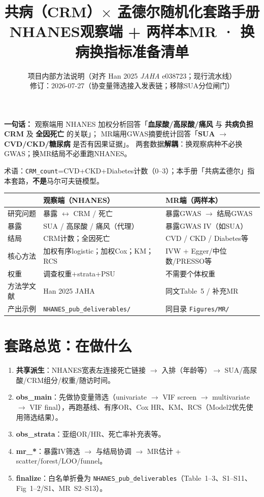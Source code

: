 \documentclass[11pt,a4paper]{article}
\title{\textbf{共病（CRM）$\times$ 孟德尔随机化套路手册}\\[0.4em]
\large NHANES观察端 + 两样本MR · 换病换指标准备清单}
\author{项目内部方法说明（对齐 Han 2025 \textit{JAHA} e038723；现行流水线）\\
\small 修订：2026-07-27（协变量筛选接入发表链；移除SUA分位闸门）}
\date{}
\begin{document}
\maketitle
\thispagestyle{fancy}

\noindent
\textbf{一句话：}
观察端用 NHANES 加权分析回答「\textbf{血尿酸/高尿酸/痛风} 与 \textbf{共病负担CRM} 及 \textbf{全因死亡} 的关联」；
MR端用GWAS摘要统计回答「\textbf{SUA} $\rightarrow$ \textbf{CVD/CKD/糖尿病} 是否有因果证据」。
两套数据\textbf{解耦}：换观察病种不必换GWAS；换MR结局不必重跑NHANES。

\noindent\small\color{gray!40!black}
术语：\texttt{CRM\_count}=CVD+CKD+Diabetes计数（0--3）；本手册「共病孟德尔」指本套路，\textbf{不是}马尔可夫链模型。

\vspace{0.5em}
\begin{center}
\small
\begin{tabular}{@{}L{0.20\textwidth}L{0.38\textwidth}L{0.38\textwidth}@{}}
\toprule
& \textbf{观察端（NHANES）} & \textbf{MR端（两样本）} \\
\midrule
研究问题 & 暴露 $\leftrightarrow$ CRM / 死亡 & 暴露GWAS $\rightarrow$ 结局GWAS \\
暴露 & SUA / 高尿酸 / 痛风（代理） & 暴露GWAS IV（如SUA） \\
结局 & CRM计数；全因死亡 & CVD / CKD / Diabetes等 \\
核心方法 & 加权有序logistic；加权Cox；KM；RCS & IVW + Egger/中位数/PRESSO等 \\
权重 & 调查权重+strata+PSU & 不需要个体权重 \\
方法学文献 & Han 2025 JAHA & 同文Table~5 / 补充MR \\
产出示例 & \texttt{NHANES\_pub\_deliverables/} & 同目录 \texttt{Figures/MR/} \\
\bottomrule
\end{tabular}
\end{center}

\section{套路总览：在做什么}

\begin{enumerate}
  \item \textbf{共享派生}：NHANES宽表左连接死亡链接 $\rightarrow$ 入排（年龄等）$\rightarrow$ SUA/高尿酸/CRM组分/权重/随访时间。
  \item \textbf{obs\_main}：先做协变量筛选（univariate $\rightarrow$ VIF screen $\rightarrow$ multivariate $\rightarrow$ VIF final），再跑基线、有序OR、Cox HR、KM、RCS（Model2优先使用筛选结果）。
  \item \textbf{obs\_strata}：亚组OR/HR、死亡率补充表等。
  \item \textbf{mr\_*}：暴露IV筛选 $\rightarrow$ 与结局协调 $\rightarrow$ MR估计 + scatter/forest/LOO/funnel。
  \item \textbf{finalize}：白名单折叠为 \texttt{NHANES\_pub\_deliverables}（Table~1--3、S1--S11、Fig~1--2/S1、MR~S2--S13）。
\end{enumerate}
\end{document}
